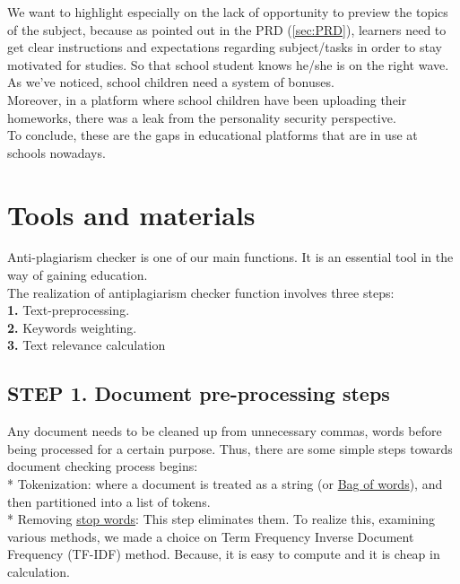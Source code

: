 We want to highlight especially on the lack of opportunity to preview the topics of the subject, because as pointed out in the PRD 
(\cref{sec:PRD}), learners need to get clear instructions and expectations regarding subject/tasks in order to stay motivated for studies. So that school student knows he/she is on the right wave. 
As we've noticed, school children need a system of bonuses. \\
Moreover, in a platform where school children have been uploading their homeworks, there was a leak from the personality security perspective. \\
To conclude, these are the gaps in educational platforms that are in use at schools nowadays. 
\section{Tools and materials}
Anti-plagiarism checker is one of our main functions. It is an essential tool in the way of gaining education.\\
The realization of antiplagiarism checker function involves three steps: \cite{gunawan2018implementation}\\
\textbf{1.} Text-preprocessing.\\
\textbf{2.} Keywords weighting.\\
\textbf{3.} Text relevance calculation\\ 
\subsection*{STEP 1. Document pre-processing steps}
Any document needs to be cleaned up from unnecessary commas, words before being processed for a certain purpose. Thus, there are some simple steps towards document checking process begins:\\
* Tokenization: where a document is treated as a string (or \hyperlink{thebag}{Bag of words}), and then partitioned into a list of tokens.\\
* Removing \hyperlink{stopwords}{stop words}: This step eliminates them.
To realize this, examining various methods\cite{ramos2003using, trstenjak2014knn, 9194665}, we made a choice on Term Frequency Inverse Document Frequency (TF-IDF) method. Because, it is easy to compute and it is cheap in calculation. 

